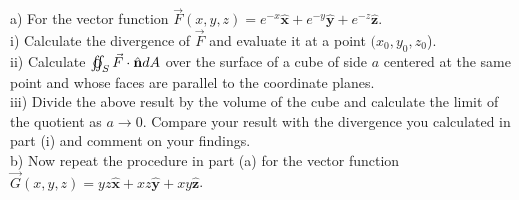 \documentclass[11pt,letterpaper,boxed]{hmcpset}
\begin{document}
	\begin{problem}
a) For the vector function $\vec{F}(x,y,z) = e^{-x}\hat{\mathbf{x}} + e^{-y}\hat{\mathbf{y}} + e^{-z}\hat{\mathbf{z}}$.\\
i) Calculate the divergence of $\vec{F}$ and evaluate it at a point $(x_0, y_0, z_0$). \\
ii) Calculate $\varoiint_S \vec{F}\cdot \hat{\mathbf{n}} dA$ over the surface of a cube of side $a$ centered at the same point and whose  faces are parallel to the coordinate planes. \\
iii)  Divide the above result by the volume of the cube and calculate the limit of the quotient as
$a \rightarrow 0$. Compare your result with the divergence you calculated in part (i) and comment on your findings. \\
b) Now repeat the procedure in part (a) for the vector function $\vec{G}(x,y,z) = yz\hat{\mathbf{x}} + xz\hat{\mathbf{y}} + xy\hat{\mathbf{z}}$.
	\end{problem}
	
	\begin{solution}
		\vfill
	\end{solution}
	\newpage
	
\end{document}
